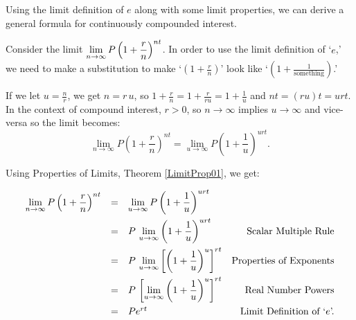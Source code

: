 \documentclass{ximera}
\begin{document}
\medskip

Using the limit definition of $e$ along with some limit properties, we can derive a general formula for continuously compounded interest. 

\medskip

 Consider the limit $\ds{\lim_{n \rightarrow \infty} P\left(1 + \frac{r}{n}\right)^{nt}}$.   In order to use the limit definition of `$e$,' we need to make a substitution to make `$\left(1 + \frac{r}{n}\right)$' look like `$\left(1 + \frac{1}{\text{something}}\right)$.'  
 
 \medskip
 
If we let $u = \frac{n}{r}$, we get $n = r \, u$, so  $1 + \frac{r}{n} = 1 + \frac{r}{ru} = 1 + \frac{1}{u}$ and $nt = (ru)t  = urt$.  In the context of compound interest, $r > 0$, so $n \rightarrow \infty$ implies $u \rightarrow \infty$ and vice-versa so the limit becomes: 
\[ \lim_{n \rightarrow \infty} P\left(1 + \frac{r}{n}\right)^{nt} =  \lim_{u \rightarrow \infty} P\left(1 + \frac{1}{u}\right)^{urt}.\]

\smallskip

Using Properties of Limits, Theorem \ref{LimitProp01}, we get:

\[ \begin{array}{rclr} 

\ds{\lim_{n \rightarrow \infty} P\left(1 + \frac{r}{n}\right)^{nt}} & = &  \ds{\lim_{u \rightarrow \infty} P\left(1 + \frac{1}{u}\right)^{urt}} & \\[10pt]
                                                                                        & = & \ds{P \, \lim_{u \rightarrow \infty} \left(1 + \frac{1}{u}\right)^{urt}} & \text{Scalar Multiple Rule} \\[10pt]
                                                                                        & = & \ds{P \, \lim_{u \rightarrow \infty} \left[\left(1 + \frac{1}{u}\right)^{u}\right]^{rt}} & \text{Properties of Exponents}\\[10pt]
                                                                                        & = & \ds{P \, \left[  \lim_{u \rightarrow \infty} \left(1 + \frac{1}{u}\right)^{u} \right]^{rt}} & \text{Real Number Powers}\\[10pt]
                                                                                        & = & Pe^{rt} & \text{Limit Definition of `$e$'.}\\ \end{array}\]
                                                                                        
\end{document}
